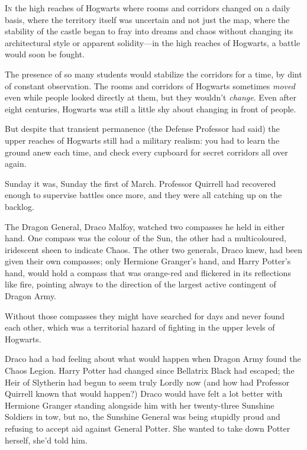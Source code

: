 
\lettrine{I}{n} the high reaches of Hogwarts where rooms and corridors changed on a daily basis, where the territory itself was uncertain and not just the map, where the stability of the castle began to fray into dreams and chaos without changing its architectural style or apparent solidity—in the high reaches of Hogwarts, a battle would soon be fought.

The presence of so many students would stabilize the corridors for a time, by dint of constant observation. The rooms and corridors of Hogwarts sometimes \emph{moved} even while people looked directly at them, but they wouldn't \emph{change}. Even after eight centuries, Hogwarts was still a little shy about changing in front of people.

But despite that transient permanence (the Defense Professor had said) the upper reaches of Hogwarts still had a military realism: you had to learn the ground anew each time, and check every cupboard for secret corridors all over again.

Sunday it was, Sunday the first of March. Professor Quirrell had recovered enough to supervise battles once more, and they were all catching up on the backlog.

The Dragon General, Draco Malfoy, watched two compasses he held in either hand. One compass was the colour of the Sun, the other had a multicoloured, iridescent sheen to indicate Chaos. The other two generals, Draco knew, had been given their own compasses; only Hermione Granger's hand, and Harry Potter's hand, would hold a compass that was orange-red and flickered in its reflections like fire, pointing always to the direction of the largest active contingent of Dragon Army.

Without those compasses they might have searched for days and never found each other, which was a territorial hazard of fighting in the upper levels of Hogwarts.

Draco had a bad feeling about what would happen when Dragon Army found the Chaos Legion. Harry Potter had changed since Bellatrix Black had escaped; the Heir of Slytherin had begun to seem truly Lordly now (and how had Professor Quirrell known that would happen?) Draco would have felt a lot better with Hermione Granger standing alongside him with her twenty-three Sunshine Soldiers in tow, but no, the Sunshine General was being stupidly proud and refusing to accept aid against General Potter. She wanted to take down Potter herself, she'd told him.

